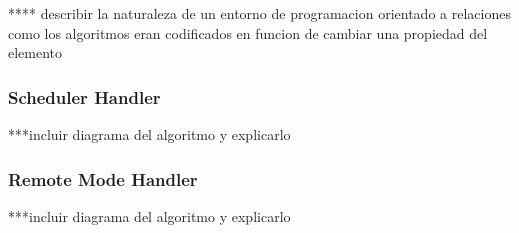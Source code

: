 **** describir la naturaleza de un entorno de programacion orientado a relaciones como los algoritmos eran codificados en funcion de cambiar una propiedad del elemento

\subsubsection{Scheduler Handler}

***incluir diagrama del algoritmo y explicarlo 

\subsubsection{Remote Mode Handler}

***incluir diagrama del algoritmo y explicarlo 